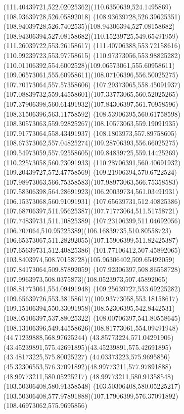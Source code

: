 {{		\curveto(111.40439721,522.02025362)(110.6350639,524.1495869)(108.93639728,526.05892018)
		\curveto(108.93639728,526.39625351)(108.94039728,526.7402535)(108.94306394,527.08158682)
		\curveto(108.94306394,527.08158682)(110.15239725,549.65491959)(111.26039722,553.26158617)
		\lineto(111.40706388,553.72158616)
		\lineto(110.99239723,553.97758615)
		\curveto(110.97373056,553.98825282)(110.01106392,554.6002528)(109.06573061,555.60958611)
		\curveto(109.06573061,555.60958611)(108.07106396,556.50025275)(107.70173064,557.57358606)
		\curveto(107.29373065,558.45091937)(107.08839732,559.44558601)(107.33773065,560.52025265)
		\curveto(107.37906398,560.61491932)(107.84306397,561.70958596)(108.31506396,563.11758592)
		\lineto(108.53906395,560.61758598)
		\curveto(108.30573063,559.92825267)(108.10573063,559.19091935)(107.91773064,558.43491937)
		\curveto(108.1803973,557.89758605)(108.67373062,557.04825274)(109.28706393,556.66025275)
		\curveto(109.54973059,557.92558605)(109.84839725,559.14425269)(110.22573058,560.23091933)
		\lineto(110.28706391,560.40691932)
		\lineto(109.20439727,572.47758569)
		\curveto(109.21906394,570.6722524)(107.98973063,566.75358583)(107.98973063,566.75358583)
		\curveto(107.58306398,564.28691923)(106.20039734,561.03491931)(106.15373068,560.91091931)
		\moveto(107.65639731,512.40825386)
		\curveto(107.68706397,511.95625387)(107.71773064,511.51758721)(107.74839731,511.10825389)
		\curveto(107.23106399,511.04692056)(106.707064,510.95225389)(106.16839735,510.80558723)
		\curveto(106.65373067,511.28292055)(107.15906399,511.82425387)(107.65639731,512.40825386)
		\moveto(101.77106412,507.45892065)
		\curveto(103.8403974,508.70158728)(105.96306402,509.65492059)(107.84173064,509.87892059)
		\curveto(107.92306397,508.86558728)(107.9963973,508.0375873)(108.0523973,507.45892065)
		\closepath
		\moveto(108.81773061,554.09491948)
		\curveto(109.25639727,553.69225282)(109.65639726,553.38158617)(109.93773058,553.18158617)
		\curveto(109.15106394,550.33091958)(108.52306395,542.8442531)(108.05106397,537.88025322)
		\curveto(108.00706397,541.80558645)(108.13106396,549.44558626)(108.81773061,554.09491948)
		\moveto(44.71239888,568.97625244)
		\curveto(43.85773224,571.04291906)(43.45239891,575.42691895)(43.45239891,575.42691895)
		\lineto(43.48173225,575.80025227)
		\lineto(44.03373223,575.9695856)
		\curveto(45.32306553,576.37091892)(48.99773211,577.97891888)(48.99773211,580.05225217)
		\lineto(48.99773211,580.91358548)
		\lineto(103.50306408,580.91358548)
		\lineto(103.50306408,580.05225217)
		\curveto(103.50306408,577.97891888)(107.17906399,576.37091892)(108.46973062,575.9695856)
}}
